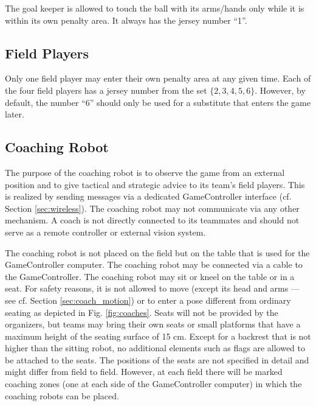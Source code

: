 \documentclass[12pt]{article}
\newcommand{\cf}{\mbox{cf.}\xspace}
\begin{document}
The goal keeper is allowed to touch the ball with its arms/hands only while it is within its own penalty area. It always has the jersey number ``1''.

\subsection{Field Players}
\label{sec:field_players}
Only one field player may enter their own penalty area at any given time. Each of the four field players has a jersey number from the set $\{2, 3, 4, 5, 6\}$. However, by default, the number ``6'' should only be used for a substitute that enters the game later.

\subsection{Coaching Robot}
\label{sec:coaching_robot}

The purpose of the coaching robot is to observe the game from an external position and to give tactical and strategic advice to its team's field players. This is realized by sending messages via a dedicated GameController interface (\cf Section \ref{sec:wireless}). The coaching robot may not communicate via any other mechanism.  A coach is not directly connected to its teammates and should not serve as a remote controller or external vision system.

The coaching robot is not placed on the field but on the table that is used for the GameController computer.  The coaching robot may be connected via a cable to the GameController. The coaching robot may sit or kneel on the table or in a seat. For safety reasons, it is not allowed to move (except its head and arms --- see \cf Section \ref{sec:coach_motion}) or to enter a pose different from ordinary seating as depicted in Fig. \ref{fig:coaches}.  Seats will not be provided by the organizers, but teams may bring their own seats or small platforms that have a maximum height of the seating surface of 15 cm. Except for a backrest that is not higher than the sitting robot, no additional elements such as flags are allowed to be attached to the seats. The positions of the seats are not specified in detail and might differ from field to field. However, at each field there will be marked coaching zones (one at each side of the GameController computer) in which the coaching robots can be placed.
\end{document}
